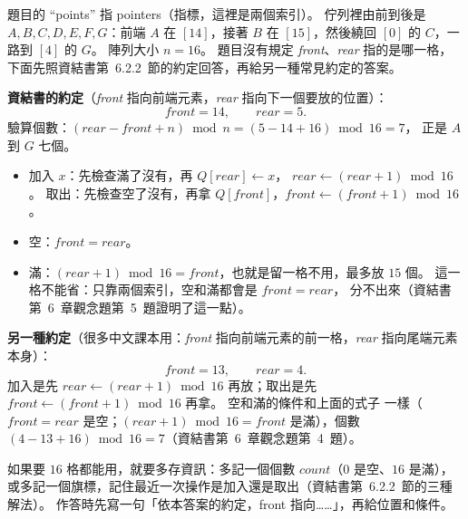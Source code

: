 \begin{pastsoln}
題目的 ``points'' 指 pointers（指標，這裡是兩個索引）。 佇列裡由前到後是
$A, B, C, D, E, F, G$：前端 $A$ 在 $[14]$，接著 $B$ 在 $[15]$，然後繞回 $[0]$ 的 $C$，一路到
$[4]$ 的 $G$。 陣列大小 $n = 16$。 題目沒有規定 \textit{front}、\textit{rear} 指的是哪一格，
下面先照資結書第~6.2.2~節的約定回答，再給另一種常見約定的答案。

\textbf{資結書的約定}（\textit{front} 指向前端元素，\textit{rear} 指向下一個要放的位置）：
\[
\mathit{front} = 14, \qquad \mathit{rear} = 5 .
\]
驗算個數：$(\mathit{rear} - \mathit{front} + n) \bmod n = (5 - 14 + 16) \bmod 16 = 7$，
正是 $A$ 到 $G$ 七個。
\begin{itemize}
\item 加入 $x$：先檢查滿了沒有，再 $Q[\mathit{rear}] \gets x$，
$\mathit{rear} \gets (\mathit{rear} + 1) \bmod 16$。 取出：先檢查空了沒有，再拿
$Q[\mathit{front}]$，$\mathit{front} \gets (\mathit{front} + 1) \bmod 16$。
\item 空：$\mathit{front} = \mathit{rear}$。
\item 滿：$(\mathit{rear} + 1) \bmod 16 = \mathit{front}$，也就是留一格不用，最多放
$15$ 個。 這一格不能省：只靠兩個索引，空和滿都會是 $\mathit{front} = \mathit{rear}$，
分不出來（資結書第~6~章觀念題第~5~題證明了這一點）。
\end{itemize}

\textbf{另一種約定}（很多中文課本用：\textit{front} 指向前端元素的前一格，\textit{rear}
指向尾端元素本身）：
\[
\mathit{front} = 13, \qquad \mathit{rear} = 4 .
\]
加入是先 $\mathit{rear} \gets (\mathit{rear} + 1) \bmod 16$ 再放；取出是先
$\mathit{front} \gets (\mathit{front} + 1) \bmod 16$ 再拿。 空和滿的條件和上面的式子
一樣（$\mathit{front} = \mathit{rear}$ 是空；$(\mathit{rear} + 1) \bmod 16 =
\mathit{front}$ 是滿），個數 $(4 - 13 + 16) \bmod 16 = 7$（資結書第~6~章觀念題第~4~題）。

如果要 $16$ 格都能用，就要多存資訊：多記一個個數 $\mathit{count}$（$0$ 是空、$16$
是滿），或多記一個旗標，記住最近一次操作是加入還是取出（資結書第~6.2.2~節的三種解法）。
作答時先寫一句「依本答案的約定，front 指向……」，再給位置和條件。
\end{pastsoln}
